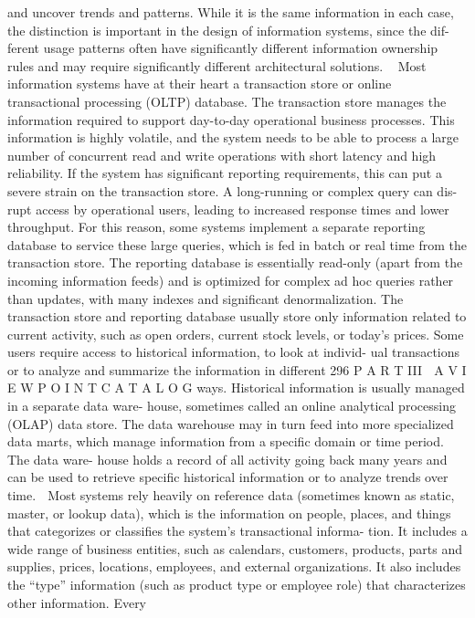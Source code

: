 and uncover trends and patterns. While it is the same information in each case,
the distinction is important in the design of information systems, since the dif-
ferent usage patterns often have significantly different information ownership
rules and may require significantly different architectural solutions.
Most information systems have at their heart a transaction store or
online transactional processing (OLTP) database. The transaction store
manages the information required to support day-to-day operational
business processes. This information is highly volatile, and the system
needs to be able to process a large number of concurrent read and write
operations with short latency and high reliability.
If the system has significant reporting requirements, this can put a severe
strain on the transaction store. A long-running or complex query can dis-
rupt access by operational users, leading to increased response times and
lower throughput. For this reason, some systems implement a separate
reporting database to service these large queries, which is fed in batch or
real time from the transaction store. The reporting database is essentially
read-only (apart from the incoming information feeds) and is optimized
for complex ad hoc queries rather than updates, with many indexes and
significant denormalization.
The transaction store and reporting database usually store only information
related to current activity, such as open orders, current stock levels, or today’s
prices. Some users require access to historical information, to look at individ-
ual transactions or to analyze and summarize the information in different
296
 P A R T III  A V I E W P O I N T C A T A L O G
ways. Historical information is usually managed in a separate data ware-
house, sometimes called an online analytical processing (OLAP) data store.
The data warehouse may in turn feed into more specialized data marts, which
manage information from a specific domain or time period. The data ware-
house holds a record of all activity going back many years and can be used to
retrieve specific historical information or to analyze trends over time.
 Most systems rely heavily on reference data (sometimes known as static,
master, or lookup data), which is the information on people, places, and
things that categorizes or classifies the system’s transactional informa-
tion. It includes a wide range of business entities, such as calendars,
customers, products, parts and supplies, prices, locations, employees, and
external organizations. It also includes the “type” information (such as
product type or employee role) that characterizes other information. Every
